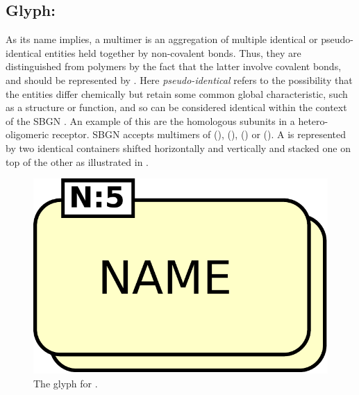 \subsection{Glyph: }
\label{sec:multimer}

As its name implies, a multimer is an aggregation of multiple identical or pseudo-identical entities held together by non-covalent bonds. Thus, they are distinguished from polymers by the fact that the latter involve covalent bonds, and should be represented by . Here \emph{pseudo-identical} refers to the possibility that the entities differ chemically but retain some common global characteristic, such as a structure or function, and so can be considered identical within the context of the SBGN \PD.  An example of this are the homologous subunits in a hetero-oligomeric receptor. SBGN \PD accepts multimers of  (),  (),  () or  (). A  is represented by two identical containers shifted horizontally and vertically and stacked one on top of the other as illustrated in .

\begin{figure}[H]
  \centering
  \includegraphics[scale = 0.3]{images/multimer}
  \caption{The \PD glyph for . }
  \label{fig:multimer}
\end{figure}
